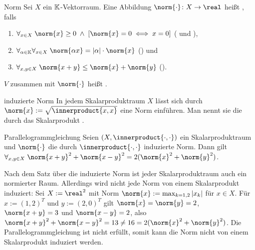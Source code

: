 \begin{Def}{Norm}
    Sei $X$ ein $\mathbb{K}$-Vektorraum.
    Eine Abbildung $\norm{\cdot}\colon X \rightarrow \real$ heißt , falls
    \begin{enumerate}
        \item
        $\forall_{x \in X}\; \norm{x} \ge 0 \;\land\; \left[\norm{x} = 0 \iff x = 0\right]$
        ( und ),

        \item
        $\forall_{\alpha \in \KK} \forall_{x \in X}\; \norm{\alpha x} = |\alpha| \cdot \norm{x}$
        () und

        \item
        $\forall_{x, y \in X}\; \norm{x + y} \le \norm{x} + \norm{y}$
        ().
    \end{enumerate}
    $V$ zusammen mit $\norm{\cdot}$ heißt .
\end{Def}

\linie
\pagebreak

\begin{Satz}{induzierte Norm}
    In jedem Skalarproduktraum $X$ lässt sich durch $\norm{x} := \sqrt{\innerproduct{x, x}}$ eine Norm
    einführen.
    Man nennt sie die durch das Skalarprodukt .
\end{Satz}

\begin{Satz}{Parallelogrammgleichung}
    Seien $(X, \innerproduct{\cdot, \cdot})$ ein Skalarproduktraum und $\norm{\cdot}$ die durch
    $\innerproduct{\cdot, \cdot}$ induzierte Norm.
    Dann gilt
    $\forall_{x, y \in X}\; \norm{x + y}^2 + \norm{x - y}^2 = 2(\norm{x}^2 + \norm{y}^2)$.
\end{Satz}

\begin{Bem}
    Nach dem Satz über die induzierte Norm ist jeder Skalarproduktraum auch ein normierter Raum.
    Allerdings wird nicht jede Norm von einem Skalarprodukt induziert:
    Sei $X := \real^2$ mit Norm $\norm{x} := \max_{k = 1, 2} |x_k|$ für $x \in X$.
    Für $x := (1, 2)^T$ und $y := (2, 0)^T$ gilt $\norm{x} = \norm{y} = 2$,
    $\norm{x + y} = 3$ und $\norm{x - y} = 2$, also
    $\norm{x + y}^2 + \norm{x - y}^2 = 13 \not= 16 = 2(\norm{x}^2 + \norm{y}^2)$.
    Die Parallelogrammgleichung ist nicht erfüllt, somit kann die Norm nicht von einem
    Skalarprodukt induziert werden.
\end{Bem}

